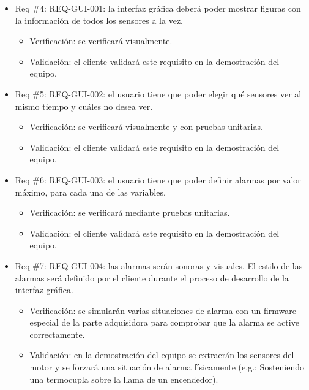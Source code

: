 \documentclass[11pt]{charter}
\begin{document}
\begin{itemize} 
\item Req \#4: REQ-GUI-001: la interfaz gráfica deberá poder mostrar figuras con la información
de todos los sensores a la vez.
\begin{itemize}
\item Verificación: se verificará visualmente.
\item Validación: el cliente validará este requisito en la demostración del equipo.
\end{itemize}
\end{itemize}

\begin{itemize} 
\item Req \#5: REQ-GUI-002: el usuario tiene que poder elegir qué sensores ver al mismo tiempo
y cuáles no desea ver.
\begin{itemize}
\item Verificación: se verificará visualmente y con pruebas unitarias.
\item Validación: el cliente validará este requisito en la demostración del equipo.
\end{itemize}
\end{itemize}

\begin{itemize} 
\item Req \#6: REQ-GUI-003: el usuario tiene que poder definir alarmas por valor máximo, para
cada una de las variables.
\begin{itemize}
\item Verificación: se verificará mediante pruebas unitarias.
\item Validación: el cliente validará este requisito en la demostración del equipo.
\end{itemize}
\end{itemize}

\begin{itemize} 
\item Req \#7: REQ-GUI-004: las alarmas serán sonoras y visuales. El estilo de las alarmas será
definido por el cliente durante el proceso de desarrollo de la interfaz gráfica.
\begin{itemize}
\item Verificación: se simularán varias situaciones de alarma con un firmware especial de la parte adquisidora para comprobar que la alarma se active correctamente.
\item Validación: en la demostración del equipo se extraerán los sensores del motor y se forzará una situación de alarma físicamente (e.g.: Sosteniendo una termocupla sobre la llama de un encendedor).
\end{itemize}
\end{itemize}
\end{document}
